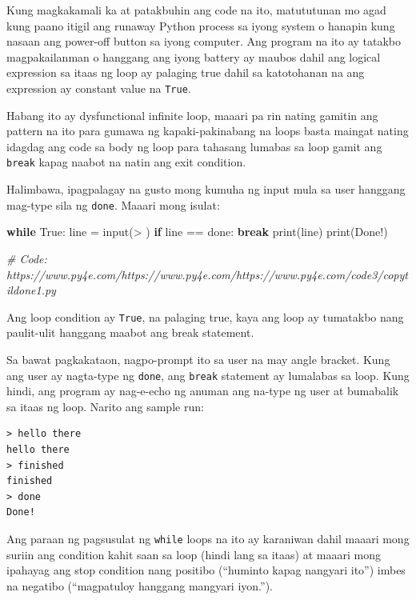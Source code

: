 \documentclass[10pt,]{book}
\newenvironment{Shaded}{}{}
\newcommand{\BuiltInTok}[1]{\textcolor[rgb]{0.00,0.50,0.00}{#1}}
\newcommand{\CommentTok}[1]{\textcolor[rgb]{0.38,0.63,0.69}{\textit{#1}}}
\newcommand{\ControlFlowTok}[1]{\textcolor[rgb]{0.00,0.44,0.13}{\textbf{#1}}}
\newcommand{\NormalTok}[1]{#1}
\newcommand{\OperatorTok}[1]{\textcolor[rgb]{0.40,0.40,0.40}{#1}}
\newcommand{\StringTok}[1]{\textcolor[rgb]{0.25,0.44,0.63}{#1}}
\newcommand{\VariableTok}[1]{\textcolor[rgb]{0.10,0.09,0.49}{#1}}
\begin{document}
Kung magkakamali ka at patakbuhin ang code na ito, matututunan mo agad
kung paano itigil ang runaway Python process sa iyong system o hanapin
kung nasaan ang power-off button sa iyong computer. Ang program na ito
ay tatakbo magpakailanman o hanggang ang iyong battery ay maubos dahil
ang logical expression sa itaas ng loop ay palaging true dahil sa
katotohanan na ang expression ay constant value na \texttt{True}.

Habang ito ay dysfunctional infinite loop, maaari pa rin nating gamitin
ang pattern na ito para gumawa ng kapaki-pakinabang na loops basta
maingat nating idagdag ang code sa body ng loop para tahasang lumabas sa
loop gamit ang \texttt{break} kapag naabot na natin ang exit condition.

Halimbawa, ipagpalagay na gusto mong kumuha ng input mula sa user
hanggang mag-type sila ng \texttt{done}. Maaari mong isulat:

\begin{Shaded}
\begin{Highlighting}[]
\ControlFlowTok{while} \VariableTok{True}\NormalTok{:}
\NormalTok{    line }\OperatorTok{=} \BuiltInTok{input}\NormalTok{(}\StringTok{\textquotesingle{}\textgreater{} \textquotesingle{}}\NormalTok{)}
    \ControlFlowTok{if}\NormalTok{ line }\OperatorTok{==} \StringTok{\textquotesingle{}done\textquotesingle{}}\NormalTok{:}
        \ControlFlowTok{break}
    \BuiltInTok{print}\NormalTok{(line)}
\BuiltInTok{print}\NormalTok{(}\StringTok{\textquotesingle{}Done!\textquotesingle{}}\NormalTok{)}

\CommentTok{\# Code: https://www.py4e.com/https://www.py4e.com/https://www.py4e.com/code3/copytildone1.py}
\end{Highlighting}
\end{Shaded}

Ang loop condition ay \texttt{True}, na palaging true, kaya ang loop ay
tumatakbo nang paulit-ulit hanggang maabot ang break statement.

Sa bawat pagkakataon, nagpo-prompt ito sa user na may angle bracket.
Kung ang user ay nagta-type ng \texttt{done}, ang \texttt{break}
statement ay lumalabas sa loop. Kung hindi, ang program ay nag-e-echo ng
anuman ang na-type ng user at bumabalik sa itaas ng loop. Narito ang
sample run:

{\small
\begin{verbatim}
> hello there
hello there
> finished
finished
> done
Done!
\end{verbatim}
}

Ang paraan ng pagsusulat ng \texttt{while} loops na ito ay karaniwan
dahil maaari mong suriin ang condition kahit saan sa loop (hindi lang sa
itaas) at maaari mong ipahayag ang stop condition nang positibo
(``huminto kapag nangyari ito'') imbes na negatibo (``magpatuloy
hanggang mangyari iyon.'').
\end{document}
